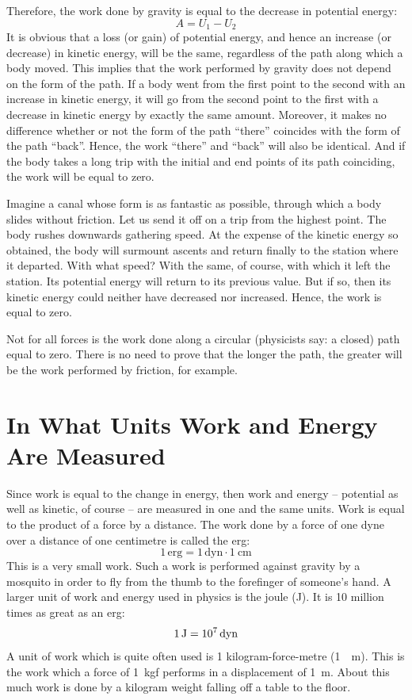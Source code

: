 Therefore, the work done by gravity is equal to the
decrease in potential energy:
\begin{equation*}%
A = U_{1} - U_{2}
\end{equation*}
It is obvious that a loss (or gain) of potential energy,
and hence an increase (or decrease) in kinetic energy,
will be the same, regardless of the path along which a body
moved. This implies that the work performed by gravity
does not depend on the form of the path. If a body went
from the first point to the second with an increase in
kinetic energy, it will go from the second point to the
first with a decrease in kinetic energy by exactly the same
amount. Moreover, it makes no difference whether or
not the form of the path ``there'' coincides with the form
of the path ``back''. Hence, the work ``there'' and ``back''
will also be identical. And if the body takes a long trip
with the initial and end points of its path coinciding, the
work will be equal to zero.

Imagine a canal whose form is as fantastic as possible,
through which a body slides without friction. Let us send
it off on a trip from the highest point. The body rushes
downwards gathering speed. At the expense of the kinetic energy so obtained, the body will surmount ascents and
return finally to the station where it departed. With
what speed? With the same, of course, with which it
left the station. Its potential energy will return to its
previous value. But if so, then its kinetic energy could
neither have decreased nor increased. Hence, the work
is equal to zero.

Not for all forces is the work done along a circular
(physicists say: a closed) path equal to zero. There is no
need to prove that the longer the path, the greater will
be the work performed by friction, for example.

\section{In What Units Work and Energy Are Measured}

Since work is equal to the change in energy, then work
and energy -- potential as well as kinetic, of course -- are
measured in one and the same units. Work is equal to
the product of a force by a distance. The work done by a
force of one dyne over a distance of one centimetre is
called the erg:
\begin{equation*}%
1\,\textrm{erg} = 1\,\textrm{dyn} \cdot \SI{1}{\centi\meter}
\end{equation*}
This is a very small work. Such a work is performed against
gravity by a mosquito in order to fly from the thumb to
the forefinger of someone's hand. A larger unit of work and
energy used in physics is the joule (\si{\joule}). It is 10 million times as great as an erg:
\begin{equation*}%
\SI{1}{\joule} = \num{d7} \, \textrm{dyn}
\end{equation*}
A unit of work which is quite often used is 1 kilogram-force-metre (\SI{1}{\kgf\meter}). This is the work which a force of
\SI{1}{kgf} performs in a displacement of \SI{1}{\meter}. About this much work is done by a kilogram weight falling off a table to the
floor.

